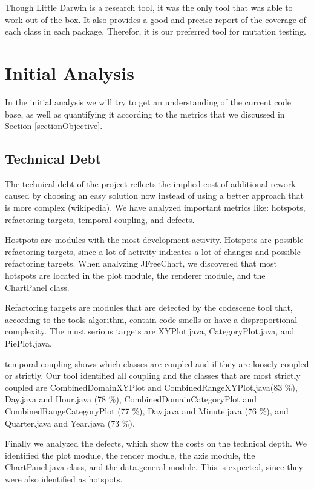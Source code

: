 \documentclass[]{article}
\begin{document}
Though Little Darwin is a research tool, it was the only tool that was able to work out of the box. It also provides a good and precise report of the coverage of each class in each package. Therefor, it is our preferred tool for mutation testing.  


\section{Initial Analysis}

In the initial analysis we will try to get an understanding of the current code base, as well as quantifying it according to the metrics that we discussed in Section \ref{sectionObjective}. 

\subsection{Technical Debt}
The technical debt of the project reflects the implied cost of additional rework caused by choosing an easy solution now instead of using a better  approach that is more complex (wikipedia).
We have analyzed important metrics like: hotspots, refactoring targets, temporal coupling, and defects.

Hostpots are modules with the most development activity. Hotspots are possible refactoring targets, since a lot of activity indicates a lot of changes and possible refactoring targets. 
When analyzing JFreeChart, we discovered that most hotspots are located in the plot module, the renderer module, and the ChartPanel class.

Refactoring targets are modules that are detected by the codescene tool that, according to the tools algorithm, contain code smells or have a disproportional complexity. The must serious targets are XYPlot.java, CategoryPlot.java, and PiePlot.java. 

temporal coupling shows which classes are coupled and if they are loosely coupled or strictly. Our tool identified all coupling and the classes that are most strictly coupled are CombinedDomainXYPlot and CombinedRangeXYPlot.java(83 \%), Day.java and Hour.java (78 \%), CombinedDomainCategoryPlot and CombinedRangeCategoryPlot (77 \%), Day.java and Minute.java (76 \%), and Quarter.java and Year.java (73 \%).

Finally we analyzed the defects, which show the costs on the technical depth. We identified the plot module, the render module, the axis module, the ChartPanel.java class, and the data.general module. This is expected, since they were also identified as hotspots.
\end{document}
